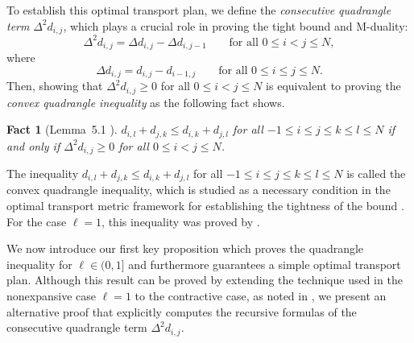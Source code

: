 \documentclass[pdflatex,sn-mathphys-num]{sn-jnl}%
\theoremstyle{thmstyleone}%
\theoremstyle{thmstyletwo}%
\newtheorem{fact}{Fact}
\theoremstyle{thmstylethree}%
\begin{document}
To establish this optimal transport plan, we define the \emph{consecutive quadrangle term} $\Delta^2 d_{i,j}$, which plays a crucial role in proving the tight bound and M-duality:
\[\Delta^2 d_{i,j} =\Delta d_{i,j} - \Delta d_{i,j-1} \qquad  \text{for all} \,\,0 \le i< j\le N,\]
where 
\[\Delta d_{i,j} = d_{i,j} - d_{i-1,j} \qquad  \text{for all} \,\,0 \le i \le j\le N.\]
Then, showing that $\Delta^2 d_{i,j} \ge 0$ for all $0 \le i< j\le N$ is equivalent to proving the \emph{convex quadrangle inequality} \cite{aygen1995optimal, bravo2021universal} as the following fact shows.
\begin{fact}[Lemma~5.1 \cite{bravo2021universal}]
    $d_{i,l}+d_{j,k} \le d_{i,k}+d_{j,l}$ for all $-1\le i\le j\le k \le l \le N$ if and only if $\Delta^2 d_{i,j} \ge 0$ for all $0 \le i< j\le N$.
\end{fact}





The inequality $d_{i,l}+d_{j,k} \le d_{i,k}+d_{j,l}$ for all $-1\le i\le j\le k \le l \le N$ is called the convex quadrangle inequality, which is studied as a necessary condition in the optimal transport metric framework for establishing the tightness of the bound
\cite{bravo2021universal, cc2023, bc2018, aygen1995optimal}. For the case $\ell=1$, this inequality was proved by \cite{bravo2021universal, aygen1995optimal}.


We now introduce our first key proposition which proves the quadrangle inequality for $\ell\in(0,1]$ and furthermore guarantees a simple optimal transport plan. Although this result can be proved by extending the technique used in the nonexpansive case $\ell=1$ to the contractive case, as noted in \cite{bravo2026krasnosel}, we present an alternative proof that explicitly computes the recursive formulas of the consecutive quadrangle term $\Delta^2 d_{i,j}$. 
\end{document}
